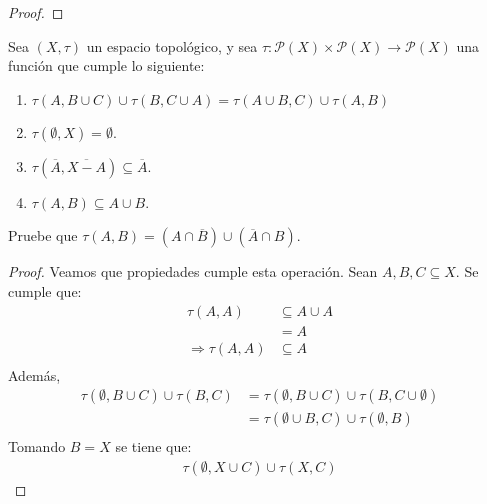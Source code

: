 \documentclass[12pt]{report}
\theoremstyle{largebreak}
\newcommand\cf[3]{\ensuremath{#1:#2\rightarrow#3}}
\newcommand{\Cls}[1]{\ensuremath{\overline{#1}}}
\begin{document}
    \begin{proof}
        
    \end{proof}

    \begin{excer}
        Sea $(X,\tau)$ un espacio topológico, y sea $\cf{\tau}{\mathcal{P}(X)\times\mathcal{P}(X)}{\mathcal{P}(X)}$ una función que cumple lo siguiente:
        \begin{enumerate}
            \item $\tau(A,B\cup C)\cup\tau(B,C\cup A)=\tau(A\cup B, C)\cup\tau(A,B)$
            \item $\tau(\emptyset, X)=\emptyset$.
            \item $\tau(\Cls{A},\Cls{X-A})\subseteq\Cls{A}$.
            \item $\tau(A,B)\subseteq A\cup B$.
        \end{enumerate}
        Pruebe que $\tau(A,B)=(A\cap\Cls{B})\cup(\Cls{A}\cap B)$.
    \end{excer}

    \begin{proof}
        Veamos que propiedades cumple esta operación. Sean $A,B,C\subseteq X$. Se cumple que:
        \begin{equation*}
            \begin{split}
                \tau(A,A)&\subseteq A\cup A\\
                &=A\\
                \Rightarrow \tau(A,A)&\subseteq A\\
            \end{split}
        \end{equation*}
        Además,
        \begin{equation*}
            \begin{split}
                \tau(\emptyset,B\cup C)\cup\tau(B, C)
                &=\tau(\emptyset,B\cup C)\cup\tau(B, C\cup\emptyset)\\
                &=\tau(\emptyset\cup B,C)\cup\tau(\emptyset, B) \\
            \end{split}
        \end{equation*}
        Tomando $B=X$ se tiene que:
        \begin{equation*}
            \begin{split}
                \tau(\emptyset,X\cup C)\cup\tau(X, C)
            \end{split}
        \end{equation*}
    \end{proof}
\end{document}

